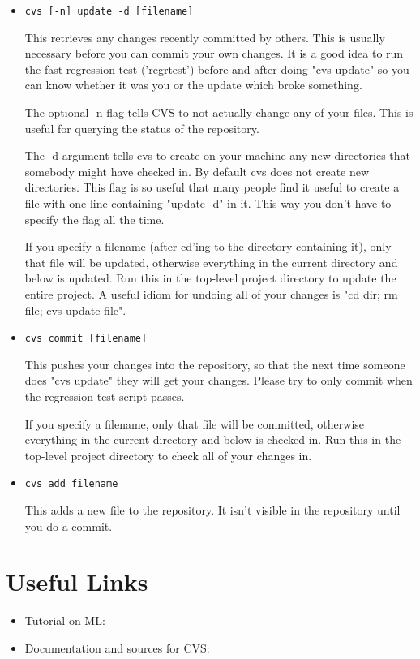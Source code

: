 \documentclass{article}
\def\t#1{{\tt #1}}
\begin{document}
\begin{itemize}
\item \t{cvs [-n] update -d [filename]}

    This retrieves any changes recently committed by others.  This is
    usually necessary before you can commit your own changes.  It is a
    good idea to run the fast regression test ('regrtest') before and
    after doing "cvs update" so you can know whether it was you or the
    update which broke something.

    The optional -n flag tells CVS to not actually change any of your
    files.  This is useful for querying the status of the repository.

    The -d argument tells cvs to create on your machine any new directories
    that somebody might have checked in. By default cvs does not create new
    directories. This flag is so useful that many people find it useful to
    create a  file with one line containing "update -d" in it.
    This way you don't have to specify the flag all the time.

    If you specify a filename (after cd'ing to the directory containing it),
    only that file will be updated, otherwise everything in the current
    directory and below is updated. Run this in the top-level project
    directory to update the entire project. A useful idiom for undoing all of
    your changes is "cd dir; rm file; cvs update file".

    
\item \t{cvs commit [filename]}

    This pushes your changes into the repository, so that the next time
    someone does "cvs update" they will get your changes.  Please try to
    only commit when the regression test script passes.
    
    If you specify a filename, only that file will be committed, otherwise
    everything in the current directory and below is checked in. Run this in
    the top-level project directory to check all of your changes in.

\item  \t{cvs add filename}

    This adds a new file to the repository.  It isn't visible in the
    repository until you do a commit.
\end{itemize}
 

\section{Useful Links}
\begin{itemize}
 \item  Tutorial on ML: 
  \item Documentation and sources for CVS:

 \end{itemize}
\end{document}
